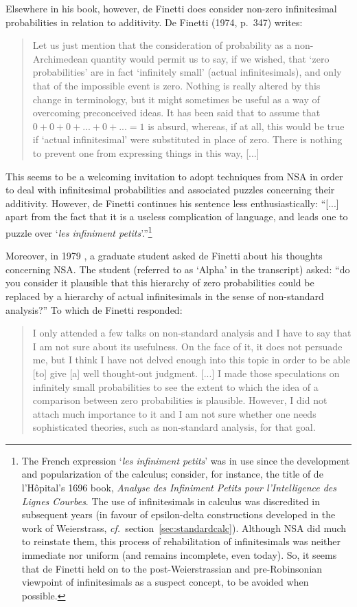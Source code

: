 Elsewhere in his book, however, de Finetti does consider non-zero infinitesimal probabilities in relation to additivity.
De Finetti (1974, p.~347) writes:
\begin{quote}
Let us just mention that the consideration of probability as a non-Archimedean quantity would permit us to say, if we wished, that `zero probabilities' are in fact `infinitely small' (actual infinitesimals), and only that of the impossible event is zero. Nothing is really altered by this change in terminology, but it might sometimes be useful as a way of overcoming preconceived ideas. It has been said that to assume that $0+0+0+ ... +0+ ... =1$ is absurd, whereas, if at all, this would be true if `actual infinitesimal' were substituted in place of zero. There is nothing to prevent one from expressing things in this way, [...]
\end{quote}
This seems to be a welcoming invitation to adopt techniques from NSA in order to deal with infinitesimal probabilities and associated puzzles concerning their additivity. However, de Finetti continues his sentence less enthusiastically:
``[...] apart from the fact that it is a useless complication of language, and leads one to puzzle over `\textit{les infiniment petits}'.''\footnote{The French expression `\textit{les infiniment petits}' was in use since the development and popularization of the calculus; consider, for instance, the title of de l'H{\^o}pital's 1696 book, \textit{Analyse des Infiniment Petits pour l'Intelligence des Lignes Courbes}. The use of infinitesimals in calculus was discredited in subsequent years (in favour of epsilon-delta constructions developed in the work of Weierstrass, \textit{cf.}\ section~\ref{sec:standardcalc}). Although NSA did much to reinstate them, this process of rehabilitation of infinitesimals was neither immediate nor uniform (and remains incomplete, even today). So, it seems that de Finetti held on to the post-Weierstrassian and pre-Robinsonian viewpoint of infinitesimals as a suspect concept, to be avoided when possible.}

Moreover, in 1979 \citep[as transcribed in][ch.~12, p.~122]{deFinetti:2008}, a graduate student asked de Finetti about his thoughts concerning NSA. The student (referred to as `Alpha' in the transcript) asked: ``do you consider it plausible that this hierarchy of zero probabilities could be replaced by a hierarchy of actual infinitesimals in the sense of non-standard analysis?'' To which de Finetti responded:
\begin{quote}
I only attended a few talks on non-standard analysis and I have to say that I am not sure about its usefulness. On the face of it, it does not persuade me, but I think I have not delved enough into this topic in order to be able [to] give [a] well thought-out judgment. [...] I made those speculations on infinitely small probabilities to see the extent to which the idea of a comparison between zero probabilities is plausible. However, I did not attach much importance to it and I am not sure whether one needs sophisticated theories, such as non-standard analysis, for that goal.
\end{quote}

